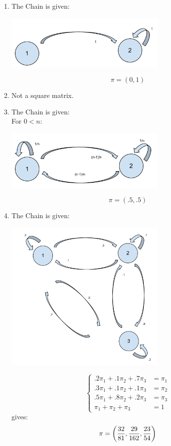 \documentclass[12pt]{article}
\begin{document}
\begin{enumerate}
\begin{enumerate}
\item The Chain is given:\\

\begin{center}
\includegraphics[width=8cm]{Markov_Chains_Ex_2-a.pdf}
\end{center}
$$\pi=(0,1)$$

\item Not a square matrix.
\item The Chain is given:\\


For $0<n$:
\begin{center}
\includegraphics[width=8cm]{Markov_Chains_Ex_2-c.pdf}
\end{center}
$$\pi=(.5,.5)$$
\item The Chain is given:\\

\begin{center}
\includegraphics[width=8cm]{Markov_Chains_Ex_2-d.pdf}
\end{center}
$$\begin{cases}
.2\pi_1+.1\pi_2+.7\pi_3&=\pi_1\\
.3\pi_1+.1\pi_2+.1\pi_3&=\pi_2\\
.5\pi_1+.8\pi_2+.2\pi_3&=\pi_3\\
\pi_1+\pi_2+\pi_3&=1
\end{cases}$$
gives:
$$\pi=\left({32\over 81},{29\over 162},{23\over 54}\right)$$


\end{enumerate}
\end{enumerate}
\end{document}
